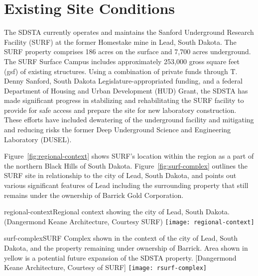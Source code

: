 \chapter{Existing Site Conditions}
\label{ch:fscf-site-cond}


The SDSTA currently operates and maintains the Sanford Underground Research Facility (SURF) at the former Homestake mine in Lead, South Dakota. The SURF property comprises 186 acres on the surface and 7,700 acres underground. The SURF Surface Campus includes approximately 253,000 gross square feet (gsf) of existing structures. Using a combination of private funds through T. Denny Sanford, South Dakota Legislature-appropriated funding, and a federal Department of Housing and Urban Development (HUD) Grant, the SDSTA has made significant progress in stabilizing and rehabilitating the SURF facility to provide for safe access and prepare the site for new laboratory construction. These efforts have included dewatering of the underground facility and mitigating and reducing risks %
 the former Deep Underground Science and Engineering Laboratory (DUSEL).

Figure~\ref{fig:regional-context} shows SURF's location within the region as a part of the northern Black Hills of South Dakota. Figure~\ref{fig:surf-complex} outlines the SURF site in relationship to the city of Lead, South Dakota, and points out various significant features of Lead including the surrounding property that still remains under the ownership of Barrick Gold Corporation. 

\begin{cdrfigure}{regional-context}{Regional context showing the city of Lead, South Dakota. (Dangermond Keane Architecture, Courtesy SURF)}
\texttt{[image: regional-context]}
\end{cdrfigure}


\begin{cdrfigure}{surf-complex}{SURF Complex shown in the context of the city of Lead, South Dakota, and the property remaining under ownership of Barrick. Area shown in yellow is a potential future expansion of the SDSTA property. [Dangermond Keane Architecture, Courtesy of SURF]}
\texttt{[image: rsurf-complex]}
\end{cdrfigure}



